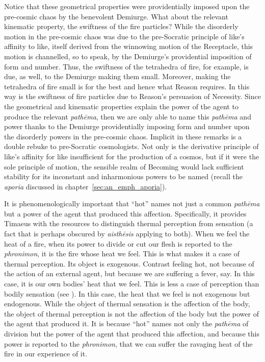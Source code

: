 Notice that these geometrical properties were providentially imposed upon the pre-cosmic chaos by the benevolent Demiurge. What about the relevant kinematic property, the swiftness of the fire particles? While the disorderly motion in the pre-cosmic chaos was due to the pre-Socratic principle of like's affinity to like, itself derived from the winnowing motion of the Receptacle, this motion is channelled, so to speak, by the Demiurge's providential imposition of form and number. Thus, the swiftness of the tetrahedra of fire, for example, is due, as well, to the Demiurge making them small. Moreover, making the tetrahedra of fire small is for the best and hence what Reason requires. In this way is the swiftness of fire particles due to Reason's persuasion of Necessity. Since the geometrical and kinematic properties explain the power of the agent to produce the relevant \emph{pathēma}, then we are only able to name this \emph{pathēma} and power thanks to the Demiurge providentially imposing form and number upon the disorderly powers in the pre-cosmic chaos. Implicit in these remarks is a double rebuke to pre-Socratic cosmologists. Not only is the derivative principle of like's affinity for like insufficient for the production of a cosmos, but if it were the sole principle of motion, the sensible realm of Becoming would lack sufficient stability for its inconstant and inharmonious powers to be named (recall the \emph{aporia} discussed in chapter~\ref{sec:an_emph_aporia}).

It is phenomenologically important that ``hot'' names not just a common \emph{pathēma} but a power of the agent that produced this affection. Specifically, it provides Timaeus with the resources to distinguish thermal perception from sensation (a fact that is perhaps obscured by \emph{aisthēsis} applying to both). When we feel the heat of a fire, when its power to divide or cut our flesh is reported to the \emph{phronimon}, it is the fire whose heat we feel. This is what makes it a case of thermal perception. Its object is exogenous. Contrast feeling hot, not because of the action of an external agent, but because we are suffering a fever, say. In this case, it is our own bodies' heat that we feel. This is less a case of perception than bodily sensation (see \citealt{Yrjonsuuri:2008aa}). In this case, the heat that we feel is not exogenous but endogenous. While the object of thermal sensation is the affection of the body, the object of thermal perception is not the affection of the body but the power of the agent that produced it.  It is because ``hot'' names not only the \emph{pathēma} of division but the power of the agent that produced this affection, and because this power is reported to the \emph{phronimon}, that we can suffer the ravaging heat of the fire in our experience of it.


